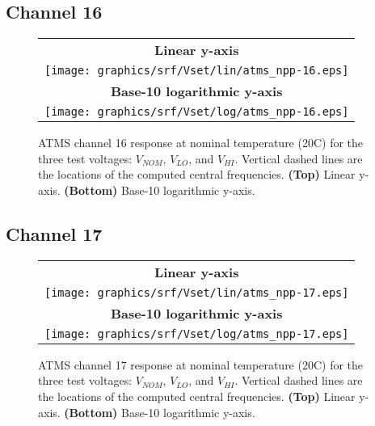 \subsection{Channel 16}
\begin{figure}[H]
  \label{fig:Vset.ch16_response}
  \centering
  \begin{tabular}{c}
    \hspace{1.75cm}\sffamily\textbf{Linear y-axis} \\
    \texttt{[image: graphics/srf/Vset/lin/atms\_npp-16.eps]} \\
    \hspace{1.75cm}\sffamily\textbf{Base-10 logarithmic y-axis} \\
    \texttt{[image: graphics/srf/Vset/log/atms\_npp-16.eps]}
  \end{tabular}
  \caption{ATMS channel 16 response at nominal temperature (20\textdegree{}C) for the three test voltages: $V_{NOM}$, $V_{LO}$, and $V_{HI}$. Vertical dashed lines are the locations of the computed central frequencies. \textbf{(Top)} Linear y-axis. \textbf{(Bottom)} Base-10 logarithmic y-axis.}
\end{figure}

\subsection{Channel 17}
\begin{figure}[H]
  \label{fig:Vset.ch17_response}
  \centering
  \begin{tabular}{c}
    \hspace{0.75cm}\sffamily\textbf{Linear y-axis} \\
    \texttt{[image: graphics/srf/Vset/lin/atms\_npp-17.eps]} \\
    \hspace{0.75cm}\sffamily\textbf{Base-10 logarithmic y-axis} \\
    \texttt{[image: graphics/srf/Vset/log/atms\_npp-17.eps]}
  \end{tabular}
  \caption{ATMS channel 17 response at nominal temperature (20\textdegree{}C) for the three test voltages: $V_{NOM}$, $V_{LO}$, and $V_{HI}$. Vertical dashed lines are the locations of the computed central frequencies. \textbf{(Top)} Linear y-axis. \textbf{(Bottom)} Base-10 logarithmic y-axis.}
\end{figure}


